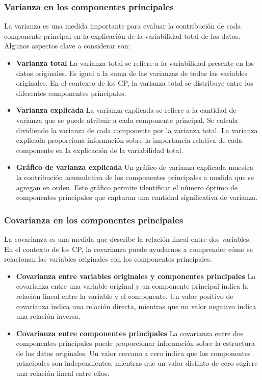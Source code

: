 \documentclass{article}
\begin{document}
\subsubsection{Varianza en los componentes principales}
La varianza es una medida importante para evaluar la contribución de cada componente principal en la explicación de la variabilidad total de los datos. Algunos aspectos clave a considerar son:
\begin{itemize}


\item \textbf{Varianza total}
La varianza total se refiere a la variabilidad presente en los datos originales. Es igual a la suma de las varianzas de todas las variables originales. En el contexto de los CP, la varianza total se distribuye entre los diferentes componentes principales.

\item \textbf{Varianza explicada}
La varianza explicada se refiere a la cantidad de varianza que se puede atribuir a cada componente principal. Se calcula dividiendo la varianza de cada componente por la varianza total. La varianza explicada proporciona información sobre la importancia relativa de cada componente en la explicación de la variabilidad total.

\item \textbf{Gráfico de varianza explicada}
Un gráfico de varianza explicada muestra la contribución acumulativa de los componentes principales a medida que se agregan en orden. Este gráfico permite identificar el número óptimo de componentes principales que capturan una cantidad significativa de varianza.
\end{itemize}
\subsubsection{Covarianza en los componentes principales}
La covarianza es una medida que describe la relación lineal entre dos variables. En el contexto de los CP, la covarianza puede ayudarnos a comprender cómo se relacionan las variables originales con los componentes principales.
\begin{itemize}
\item \textbf{Covarianza entre variables originales y componentes principales}
La covarianza entre una variable original y un componente principal indica la relación lineal entre la variable y el componente. Un valor positivo de covarianza indica una relación directa, mientras que un valor negativo indica una relación inversa.

\item \textbf{Covarianza entre componentes principales}
La covarianza entre dos componentes principales puede proporcionar información sobre la estructura de los datos originales. Un valor cercano a cero indica que los componentes principales son independientes, mientras que un valor distinto de cero sugiere una relación lineal entre ellos.
\end{itemize}
\end{document}
